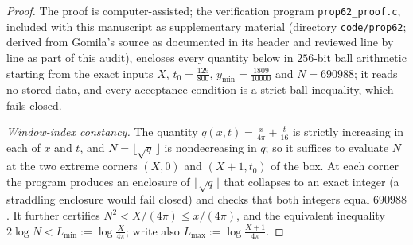 \documentclass[11pt]{article}
\theoremstyle{definition}
\begin{document}
\begin{proof}
The proof is computer-assisted; the verification program
\texttt{prop62\_proof.c}, included with this manuscript as
supplementary material (directory \texttt{code/prop62}; derived
from Gomila's source as documented in its header and reviewed line
by line as part of this audit), encloses every quantity below in
$256$-bit ball arithmetic starting from the exact inputs $X$,
$t_0=\frac{129}{800}$, $y_{\min}=\frac{1809}{10000}$ and
$N=690988$; it reads no stored data, and every acceptance
condition is a strict ball inequality, which fails closed.

\emph{Window-index constancy.} The quantity
$q(x,t)=\frac{x}{4\pi}+\frac t{16}$ is strictly increasing in each
of $x$ and $t$, and $N=\lfloor\sqrt{q}\,\rfloor$ is nondecreasing
in $q$; so it suffices to evaluate $N$ at the two extreme corners
$(X,0)$ and $(X+1,t_0)$ of the box. At each corner the program
produces an enclosure of $\lfloor\sqrt q\rfloor$ that collapses to
an exact integer (a straddling enclosure would fail closed) and
checks that both integers equal $690988$. It further certifies
$N^2<X/(4\pi)\le x/(4\pi)$, and the equivalent inequality
$2\log N<L_{\min}:=\log\frac X{4\pi}$; write also
$L_{\max}:=\log\frac{X+1}{4\pi}$.


\end{proof}
\end{document}
